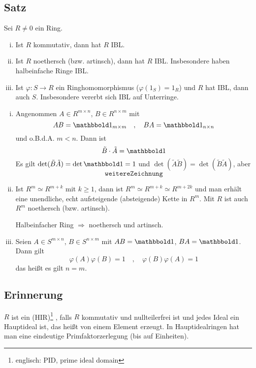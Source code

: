 \subsection[Satz: Kommutative, noethersche Ringe und Urbilder von Ringhomomorphismen haben IBL]{Satz} %
\label{sub:241}
Sei $R \not= 0$ ein Ring.
\begin{enumerate}[(i)]
	\item Ist $R$ kommutativ, dann hat $R$ IBL.
	\item Ist $R$ noethersch (bzw. artinsch), dann hat $R$ IBL. Insbesondere haben halbeinfache Ringe IBL.
	\item Ist $\varphi : S \to R$ ein Ringhomomorphismus ($\varphi(1_S)= 1_R$) und $R$ hat IBL, dann auch $S$. Insbesondere vererbt sich IBL auf Unterringe.
\end{enumerate}
\begin{enumerate}[(i)]
	\item Angenommen $A \in R^{m \times n}$, $B \in R^{n \times m}$ mit 
	\[
		AB = \ind_{m \times m}\quad , 	\quad  BA= \ind_{n \times n} 
	\]
	und o.B.d.A. $m < n$. Dann ist 
	\[
		\tilde{B} \cdot \tilde{A} = \ind
	\]
	Es gilt $\det( \tilde{B}\tilde{A})= \det \ind = 1 $ und $\det(\tilde{A}\tilde{B}) = \det(\tilde{B}\tilde{A})$, aber 
	\[
		\mathtt{weitere Zeichnung}
	\]
	\item Ist $R^m \simeq R^{m+k}$ mit $k \ge 1$, dann ist $R^m \simeq R^{m+k} \simeq R^{m+2k}$ und man erhält eine unendliche, echt aufsteigende (absteigende) Kette in
	$R^m$. Mit $R$ ist auch $R^m$ noethersch (bzw. artinsch). \light
	
	Halbeinfacher Ring $\Rightarrow $ noethersch und artinsch.
	\item Seien $A \in S^{m \times n}$, $B \in S^{n \times m}$ mit $AB = \ind$, $BA = \ind$. Dann gilt 
	\[
		\varphi(A) \varphi(B)= 1 \quad , \quad \varphi(B) \varphi(A) = 1
	\]
	das heißt es gilt $n=m$.
\end{enumerate}

\subsection*{Erinnerung} %
\label{sub:erinnerung_hir}
$R$ ist ein  (HIR)\footnote{englisch: PID, prime ideal domain} , falls $R$ kommutativ und nullteilerfrei ist und jedes Ideal ein Hauptideal ist, das 
heißt von einem Element erzeugt. In Hauptidealringen hat man eine eindeutige Primfaktorzerlegung (bis auf Einheiten).

